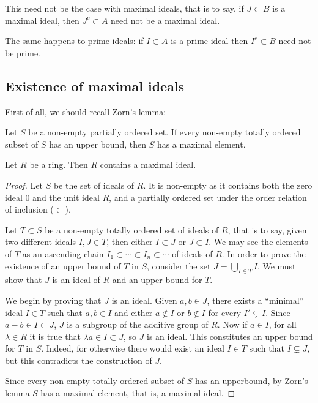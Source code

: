 This need not be the case with maximal ideals, that is to say, if $J \subset B$ is a maximal ideal, then $J^c \subset A$ need not be a maximal ideal.

The same happens to prime ideals: if $I \subset A$ is a prime ideal then $I^e \subset B$ need not be prime.





\subsection{Existence of maximal ideals}

First of all, we should recall Zorn's lemma:

\begin{theorem}
	Let $S$ be a non-empty partially ordered set. If every non-empty totally ordered subset of $S$ has an upper bound, then $S$ has a maximal element.
\end{theorem}

\begin{theorem}
	Let $R$ be a ring. Then $R$ contains a maximal ideal.
\end{theorem}
\begin{proof}
	Let $S$ be the set of ideals of $R$. It is non-empty as it contains both the zero ideal $0$ and the unit ideal $R$, and a partially ordered set under the order relation of inclusion ($\subset$).
	
	Let $T \subset S$ be a non-empty totally ordered set of ideals of $R$, that is to say, given two different ideals $I, J \in T$, then either $I \subset J$ or $J \subset I$. We may see the elements of $T$ as an ascending chain $I_1 \subset \cdots \subset I_n \subset \cdots$ of ideals of $R$. In order to prove the existence of an upper bound of $T$ in $S$, consider the set $J = \bigcup_{I \in T} I$. We must show that $J$ is an ideal of $R$ and an upper bound for $T$.
	
	We begin by proving that $J$ is an ideal. Given $a, b \in J$, there exists a ``minimal'' ideal $I \in T$ such that $a, b \in I$ and either $a \not\in I$ or $b \not\in I$ for every $I' \subsetneq I$. Since $a - b \in I \subset J$, $J$ is a subgroup of the additive group of $R$. Now if $a \in I$, for all $\lambda \in R$ it is true that $\lambda a \in I \subset J$, so $J$ is an ideal. This constitutes an upper bound for $T$ in $S$. Indeed, for otherwise there would exist an ideal $I \in T$ such that $I \subsetneq J$, but this contradicts the construction of $J$.
	
	Since every non-empty totally ordered subset of $S$ has an upperbound, by Zorn's lemma $S$ has a maximal element, that is, a maximal ideal.
\end{proof}

